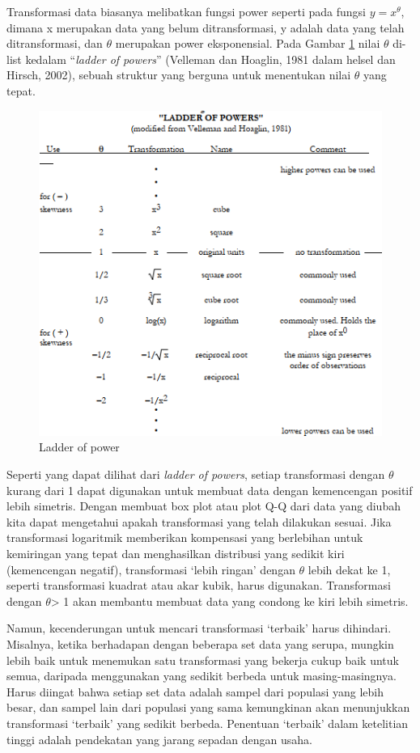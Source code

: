 \documentclass[]{book}
\begin{document}
Transformasi data biasanya melibatkan fungsi power seperti pada fungsi
\(y=x^\theta\), dimana x merupakan data yang belum ditransformasi, y
adalah data yang telah ditransformasi, dan \(\theta\) merupakan power
eksponensial. Pada Gambar \ref{fig:power} nilai \(\theta\) di-list
kedalam ``\emph{ladder of powers}'' (Velleman dan Hoaglin, 1981 dalam
helsel dan Hirsch, 2002), sebuah struktur yang berguna untuk menentukan
nilai \(\theta\) yang tepat.

\begin{figure}

{\centering \includegraphics[width=0.7\linewidth]{ladder} 

}

\caption{Ladder of power}\label{fig:power}
\end{figure}

Seperti yang dapat dilihat dari \emph{ladder of powers}, setiap
transformasi dengan \(\theta\) kurang dari 1 dapat digunakan untuk
membuat data dengan kemencengan positif lebih simetris. Dengan membuat
box plot atau plot Q-Q dari data yang diubah kita dapat mengetahui
apakah transformasi yang telah dilakukan sesuai. Jika transformasi
logaritmik memberikan kompensasi yang berlebihan untuk kemiringan yang
tepat dan menghasilkan distribusi yang sedikit kiri (kemencengan
negatif), transformasi `lebih ringan' dengan \(\theta\) lebih dekat ke
1, seperti transformasi kuadrat atau akar kubik, harus digunakan.
Transformasi dengan \(\theta\)\textgreater{} 1 akan membantu membuat
data yang condong ke kiri lebih simetris.

Namun, kecenderungan untuk mencari transformasi `terbaik' harus
dihindari. Misalnya, ketika berhadapan dengan beberapa set data yang
serupa, mungkin lebih baik untuk menemukan satu transformasi yang
bekerja cukup baik untuk semua, daripada menggunakan yang sedikit
berbeda untuk masing-masingnya. Harus diingat bahwa setiap set data
adalah sampel dari populasi yang lebih besar, dan sampel lain dari
populasi yang sama kemungkinan akan menunjukkan transformasi `terbaik'
yang sedikit berbeda. Penentuan `terbaik' dalam ketelitian tinggi adalah
pendekatan yang jarang sepadan dengan usaha.
\end{document}
